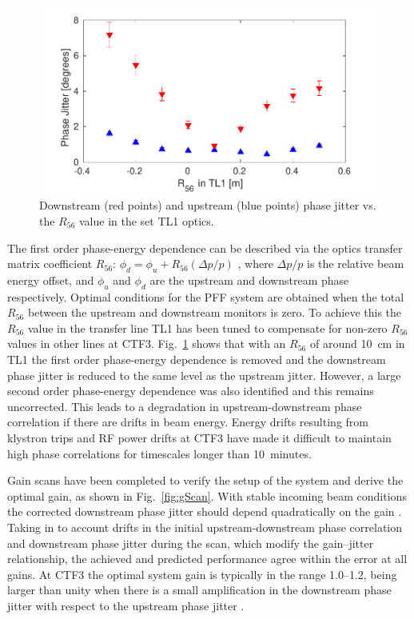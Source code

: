 \documentclass[%
 reprint,
superscriptaddress,
 amsmath,amssymb,
 prl,
]{revtex4-1}
\begin{document}
\begin{figure}
	\includegraphics[width=\columnwidth]{figs/r56Scan}%
	\caption{\label{fig:r56Scan}Downstream (red points) and upstream (blue 
		points) phase jitter vs. the \(R_{56}\) value in the set TL1 optics. 
		}
\end{figure}

The first order phase-energy dependence can be described via the optics 
transfer matrix coefficient \(R_{56}\):
\(\phi_d = \phi_u + R_{56}(\Delta p / p)\)
, where \(\Delta p / p\) is the relative beam energy offset, and \(\phi_u\) and 
\(\phi_d\) are the upstream and downstream phase respectively.
Optimal conditions for the PFF system are obtained when the total \(R_{56}\) 
between the upstream and downstream monitors is zero.
To achieve this the \(R_{56}\) value in the transfer line TL1 has been tuned to 
compensate for non-zero \(R_{56}\) values in other lines at CTF3.
Fig.~\ref{fig:r56Scan} shows that with an \(R_{56}\) of around 10~cm in TL1 the 
first order phase-energy dependence is removed and the 
downstream phase jitter is reduced to the same level as the upstream jitter. 
However, a large second order phase-energy dependence was 
also identified and 
this remains uncorrected. This leads to a degradation in upstream-downstream 
phase correlation if there are drifts in beam energy. Energy drifts resulting 
from klystron trips and RF power drifts at CTF3 have made it difficult to 
maintain high phase correlations for timescales longer than 10~minutes.

Gain scans have been completed to verify the setup of the system and derive the 
optimal gain, as shown in Fig.~\ref{fig:gScan}. With stable incoming beam 
conditions the corrected downstream phase jitter 
should depend quadratically on the gain \cite{RobertsThesis}. Taking in to 
account drifts in the initial upstream-downstream phase correlation and 
downstream phase jitter during the scan, which modify the gain--jitter 
relationship, the achieved and predicted performance agree within the error at 
all gains. At CTF3 the optimal system gain is typically in the range 1.0--1.2, 
being larger than unity when there is a small amplification in the downstream 
phase jitter with respect to the upstream phase jitter \cite{RobertsThesis}.
\end{document}
